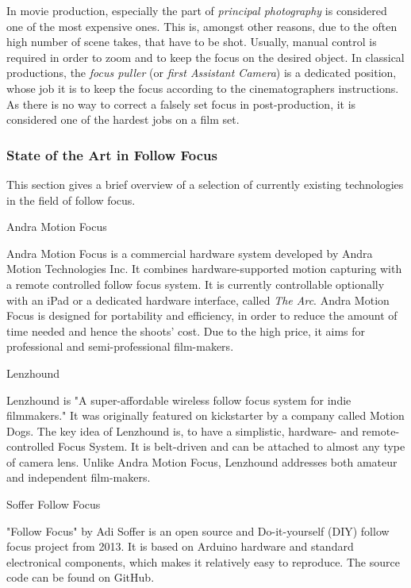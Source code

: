 \documentclass{sigchi}
\begin{document}
In movie production, especially the part of \textit{principal photography} is considered one of the most expensive ones. This is, amongst other reasons, due to the often high number of scene takes, that have to be shot. \cite{kcrabb}
Usually, manual control is required in order to zoom and to keep the focus on the desired object. In classical productions, the \textit{focus puller} (or \textit{first Assistant Camera}) is a dedicated position, whose job it is to keep the focus according to the cinematographers instructions. As there is no way to correct a falsely set focus in post-production, it is considered one of the hardest jobs on a film set. \cite{cineman}

\subsubsection{State of the Art in Follow Focus}

This section gives a brief overview of a selection of currently existing technologies in the field of follow focus. 

Andra Motion Focus

Andra Motion Focus is a commercial hardware system developed by Andra Motion Technologies Inc. It combines hardware-supported motion capturing with a remote controlled follow focus system. It is currently controllable optionally with an iPad or a dedicated hardware interface, called \textit{The Arc}. Andra Motion Focus is designed for portability and efficiency, in order to reduce the amount of time needed and hence the shoots' cost. Due to the high price, it aims for professional and semi-professional film-makers. \cite{andra}

Lenzhound

Lenzhound is "A super-affordable wireless follow focus system for indie filmmakers." \cite{kicklenz} It was originally featured on kickstarter by a company called Motion Dogs. The key idea of Lenzhound is, to have a simplistic, hardware- and remote-controlled Focus System. It is belt-driven and can be attached to almost any type of camera lens. Unlike Andra Motion Focus, Lenzhound addresses both amateur and independent film-makers. 

Soffer Follow Focus

"Follow Focus" by Adi Soffer is an open source and Do-it-yourself (DIY) follow focus project from 2013. It is based on Arduino hardware and standard electronical components, which makes it relatively easy to reproduce. The source code can be found on GitHub. \cite{soffer}
\end{document}

